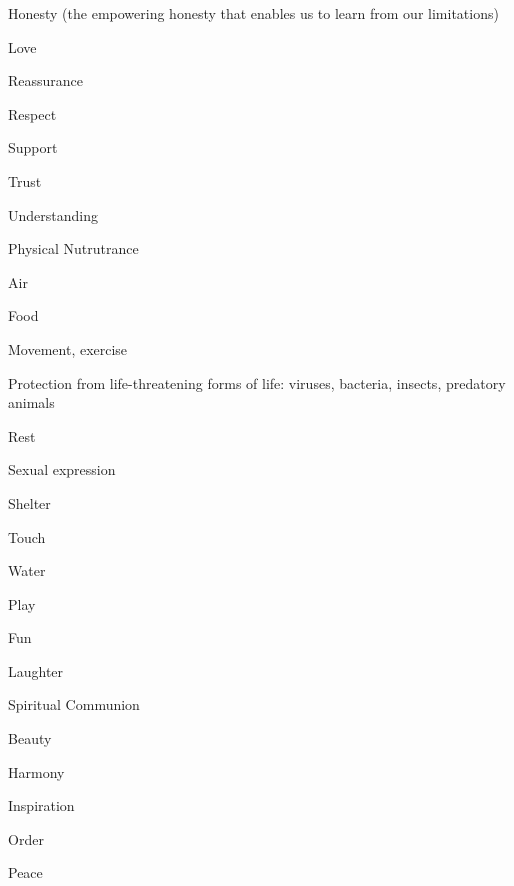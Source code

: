 {\begin{multicols}{2}
\begin{itemize*}
\begin{itemize*}
						\item Honesty (the empowering honesty that enables us to learn from our limitations)
						\item Love
						\item Reassurance
						\item Respect
						\item Support
						\item Trust
						\item Understanding
					\end{itemize*}
				\item Physical Nutrutrance
					\begin{itemize*}
						\item Air
						\item Food
						\item Movement, exercise
						\item Protection from life-threatening forms of life: viruses, bacteria, insects, predatory animals
						\item Rest
						\item Sexual expression
						\item Shelter
						\item Touch
						\item Water
					\end{itemize*}
				\item Play
					\begin{itemize*}
						\item Fun
						\item Laughter
					\end{itemize*}
				\item Spiritual Communion
					\begin{itemize*}
						\item Beauty
						\item Harmony
						\item Inspiration
						\item Order
						\item Peace
					\end{itemize*}
			\end{itemize*}
		\end{multicols}
}

